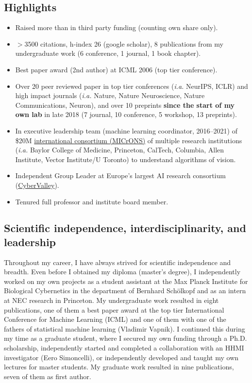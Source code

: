 \documentclass[COG,11pt]{ercgrant}
\begin{document}
\subsection{Highlights}
\begin{itemize}
    \item Raised more than  in third party funding (counting own share only).
    \item $>$3500 citations, h-index 26 (google scholar), 8 publications from my undergraduate work (6 conference, 1 journal, 1 book chapter).
    \item Best paper award (2nd author) at ICML 2006 (top tier conference).
    \item Over 20 peer reviewed paper in top tier conferences (\textit{i.a.} NeurIPS, ICLR) and high impact journals (\textit{i.a.} Nature, Nature Neuroscience, Nature Communications, Neuron), and over 10 preprints \textbf{since the start of my own lab} in late 2018 (7 journal, 10  conference, 5 workshop, 13 preprints).
    \item In executive leadership team (machine learning coordinator, 2016--2021) of \$20M \href{https://www.ninai.org/}{international consortium (MICrONS)} of multiple research institutions (\textit{i.a.} Baylor College of Medicine, Princeton, CalTech, Columbia, Allen Institute, Vector Institute/U Toronto) to understand algorithms of vision.
    \item Independent Group Leader at Europe's largest AI research consortium (\href{https://cyber-valley.de/}{CyberValley}).
    \item Tenured full professor and institute board member.
\end{itemize}

\subsection{Scientific independence, interdisciplinarity, and leadership}
Throughout my career, I have always strived for scientific independence and breadth. Even before I obtained my diploma (master's degree), I independently worked on my own  projects as a student assistant at the Max Planck Institute for Biological Cybernetics in the department of Bernhard Schölkopf and as an intern at NEC research in Princeton. My undergraduate work resulted in eight publications, one of them a best paper award at the top tier International Conference for Machine Learning (ICML) and one of them with one of the fathers of statistical machine learning (Vladimir Vapnik). I continued this during my time as a graduate student, where I secured my own funding through a Ph.D. scholarship, independently started and completed a collaboration with an HHMI investigator (Eero Simoncelli), or independently developed and taught my own lectures for master students. My graduate work resulted in nine publications, seven of them as first author. 
\end{document}
